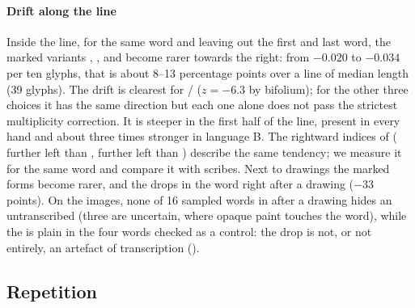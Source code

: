 \paragraph{Drift along the line} Inside the line, for the same word and leaving out the first and last word, the marked
variants , ,  and  become rarer towards the right: from $-0.020$ to $-0.034$ per ten
glyphs, that is about 8--13 percentage points over a line of median length (39 glyphs). The drift is clearest for
/ ($z = -6.3$ by bifolium); for the other three choices it has the same direction but each one alone does
not pass the strictest multiplicity correction. It is steeper in the first half of the line, present in every hand and
about three times stronger in language B. The rightward indices of \citet{feaster2021,feaster2022} ( further left
than ,  further left than ) describe the same tendency; we measure it for the same word and compare
it with scribes. Next to drawings the marked forms become rarer, and the  drops in the word right after a drawing
($-33$ points). On the images, none of 16 sampled words in  after a drawing hides an untranscribed 
(three are uncertain, where opaque paint touches the word), while the  is plain in the four  words
checked as a control: the drop is not, or not entirely, an artefact of transcription ().

\subsection{Repetition}
\label{sec:repetition}

